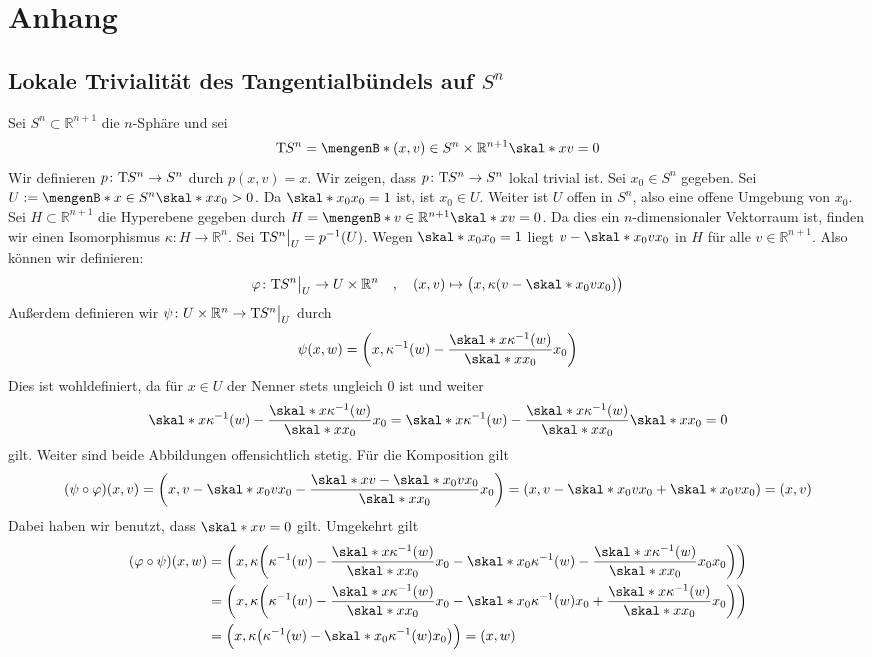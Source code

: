 

\cleardoubleoddemptypage
\appendix
\section{Anhang}

\subsection{Lokale Trivialität des Tangentialbündels auf $S^n$} %
\label{sub:lokal_trivial_Sn}
Sei $S^n \subset \mathds{R}^{n+1}$ die $n$-Sphäre und sei 
\[
	\Tmap S^n = \set[(x,v) \in S^n \times \mathds{R}^{n+1}]{\skal*{x}{v}=0} 
\]
Wir definieren $p \colon \mathrm{T}\mkern-0.85mu S^n \to S^n$ durch $p(x,v)=x$. Wir zeigen, dass $p \colon \mathrm{T}\mkern-0.85mu S^n \to S^n$ lokal trivial ist.
Sei $x_0 \in S^n$ gegeben. Sei $U := \set[x \in S^n]{\skal*{x}{x_0}>0}$. Da $\skal*{x_0}{x_0}=1$ ist, ist $x_0 \in U$. Weiter ist $U$ offen in $S^n$, also eine offene 
Umgebung von $x_0$. Sei $H \subset \mathds{R}^{n+1}$ die Hyperebene gegeben durch $H = \set[v \in \mathds{R}^{n+1}]{\skal*{x}{v}=0}$. Da dies ein $n$-dimensionaler 
Vektorraum ist, finden wir einen Isomorphismus $\kappa \colon H \to \mathds{R}^n$. Sei $\mathrm{T}\mkern-0.85mu S^n \big|_U=p^{-1}(U)$. Wegen $\skal*{x_0}{x_0}=1$ liegt $v- \skal*{x_0}{v} x_0$
in $H$ für alle $v \in \mathds{R}^{n+1}$. Also können wir definieren:
\[
	\varphi \colon \Tmap S^n\big|_{U} \to U \times \mathds{R}^n \quad , \quad (x,v) \mapsto \enbrace[\big]{x, \kappa(v - \skal*{x_0}{v} x_0)} 
\]
Außerdem definieren wir $\psi \colon U \times \mathbb{R}^n \to \mathrm{T}\mkern-0.85mu S^n \big|_U$ durch
\[
	\psi(x,w) = \enbrace*{x , \kappa^{-1}(w) - \frac{\skal*{x}{\kappa^{-1}(w)}}{\skal*{x}{x_0}} x_0 } 
\]
Dies ist wohldefiniert, da für $x \in U$ der Nenner stets ungleich $0$ ist und weiter
\[
	\skal*{x}{\kappa^{-1}(w) - \frac{\skal*{x}{\kappa ^{-1}(w)}}{\skal*{x}{x_0}} x_0} = \skal*{x}{\kappa^{-1}(w)} - \frac{\skal*{x}{\kappa ^{-1}(w)}}{\skal*{x}{x_0}} 
	\skal*{x}{x_0} = 0
\]
gilt. Weiter sind beide Abbildungen offensichtlich stetig. Für die Komposition gilt
\begin{align*}
	(\psi \circ \varphi)(x,v) = \enbrace*{x, v - \skal*{x_0}{v} x_0 - \frac{\skal*{x}{v- \skal*{x_0}{v} x_0}}{\skal*{x}{x_0}}x_0 }
	= \enbrace*{x, v - \skal*{x_0}{v} x_0 + \skal*{x_0}{v}x_0} = (x,v)  
\end{align*}
Dabei haben wir benutzt, dass $\skal*{x}{v}=0$ gilt. Umgekehrt gilt
\begin{align*}
	(\varphi \circ \psi)(x,w) &= \enbrace*{x , \kappa \enbrace*{\kappa^{-1}(w) - \frac{\skal*{x}{\kappa^{-1}(w)}}{\skal*{x}{x_0}}x_0 - \skal*{x_0}{\kappa^{-1}(w) - 
	\frac{\skal*{x}{\kappa^{-1}(w)}}{\skal*{x}{x_0}}x_0} x_0 } } \\
	&= \enbrace*{x , \kappa \enbrace*{\kappa^{-1}(w) - \frac{\skal*{x}{\kappa^{-1}(w)}}{\skal*{x}{x_0}}x_0 - 
	\skal*{x_0}{\kappa^{-1}(w)} x_0 + \frac{\skal*{x}{\kappa^{-1}(w)}}{\skal*{x}{x_0}} x_0 }}\\
	&= \enbrace[\Big]{x , \kappa \enbrace*{\kappa^{-1}(w) - \skal*{x_0}{\kappa^{-1}(w)} x_0} } = (x,w)
\end{align*}
